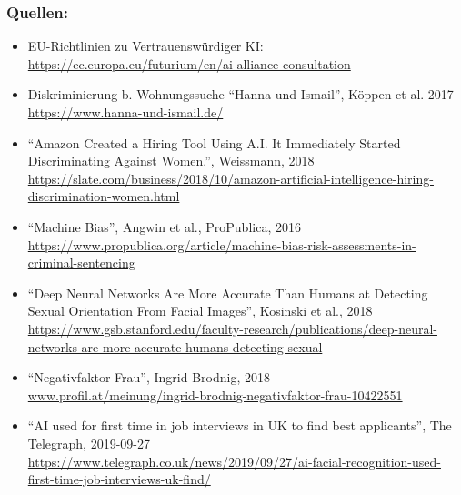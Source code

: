 \documentclass[aspectratio=169,x11names]{beamer}
\begin{document}
\begin{frame}
\frametitle{Quellen:}
\scriptsize
\begin{itemize}
\item EU-Richtlinien zu Vertrauenswürdiger KI: \url{https://ec.europa.eu/futurium/en/ai-alliance-consultation}

\item Diskriminierung b. Wohnungssuche ``Hanna und Ismail'', Köppen et al.  2017\\
\url{https://www.hanna-und-ismail.de/}

\item ``Amazon Created a Hiring Tool Using A.I. It Immediately Started Discriminating Against Women.'', Weissmann, 2018\\ \url{https://slate.com/business/2018/10/amazon-artificial-intelligence-hiring-discrimination-women.html}

\item ``Machine Bias'', Angwin et al., ProPublica, 2016\\ \url{https://www.propublica.org/article/machine-bias-risk-assessments-in-criminal-sentencing}

\item ``Deep Neural Networks Are More Accurate Than Humans at Detecting Sexual Orientation From Facial Images'', Kosinski et al., 2018\\ \url{https://www.gsb.stanford.edu/faculty-research/publications/deep-neural-networks-are-more-accurate-humans-detecting-sexual}

\item ``Negativfaktor Frau'', Ingrid Brodnig, 2018 \\ \url{www.profil.at/meinung/ingrid-brodnig-negativfaktor-frau-10422551}

\item ``AI used for first time in job interviews in UK to find best applicants'', The Telegraph, 2019-09-27 \\ \url{https://www.telegraph.co.uk/news/2019/09/27/ai-facial-recognition-used-first-time-job-interviews-uk-find/}

\end{itemize}
\end{frame}
\end{document}
